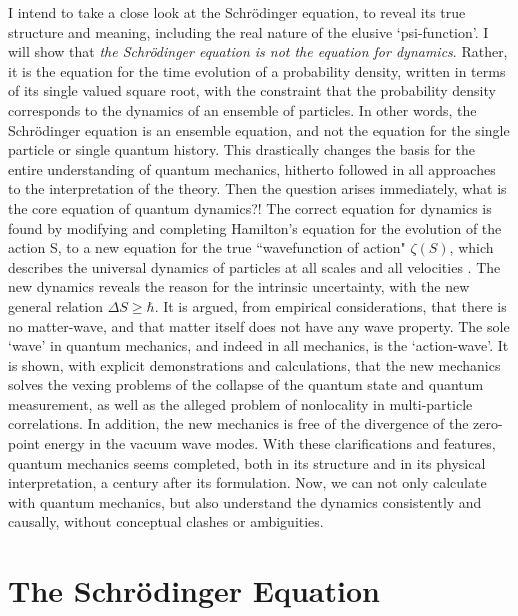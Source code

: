 I intend to take a close look at the Schr\"{o}dinger equation, to reveal its true structure
and meaning, including the real nature of the elusive `psi-function'. I will show that \textit{the
Schr\"{o}dinger equation is not the equation for dynamics}. Rather, it is the equation for the
time evolution of a probability density, written in terms of its single valued square root, with
the constraint that the probability density corresponds to the dynamics of an ensemble of
particles. In other words, the Schr\"{o}dinger equation is an ensemble equation, and not the
equation for the single particle or single quantum history. This drastically changes the basis
for the entire understanding of quantum mechanics, hitherto followed in all approaches
to the interpretation of the theory. Then the question arises immediately, what is
the core equation of quantum dynamics?! The correct equation for dynamics is found by
modifying and completing Hamilton's equation for the evolution of the action S, to a new
equation for the true ``wavefunction of action" $\zeta(S)$, which describes the universal dynamics
of particles at all scales and all velocities \cite{chap14-key2}. The new dynamics reveals the reason for the
intrinsic uncertainty, with the new general relation $\Delta S\geq\hbar$. It is argued, from empirical
considerations, that there is no matter-wave, and that matter itself does not have any wave
property. The sole `wave' in quantum mechanics, and indeed in all mechanics, is the 
`action-wave'. It is shown, with explicit demonstrations and calculations, that the new mechanics
solves the vexing problems of the collapse of the quantum state and quantum measurement,
as well as the alleged problem of nonlocality in multi-particle correlations. In addition, the
new mechanics is free of the divergence of the zero-point energy in the vacuum wave modes.
With these clarifications and features, quantum mechanics seems completed, both in its
structure and in its physical interpretation, a century after its formulation. Now, we can
not only calculate with quantum mechanics, but also understand the dynamics consistently
and causally, without conceptual clashes or ambiguities.

\section{The Schr\"{o}dinger Equation}\label{c14-sec2}

